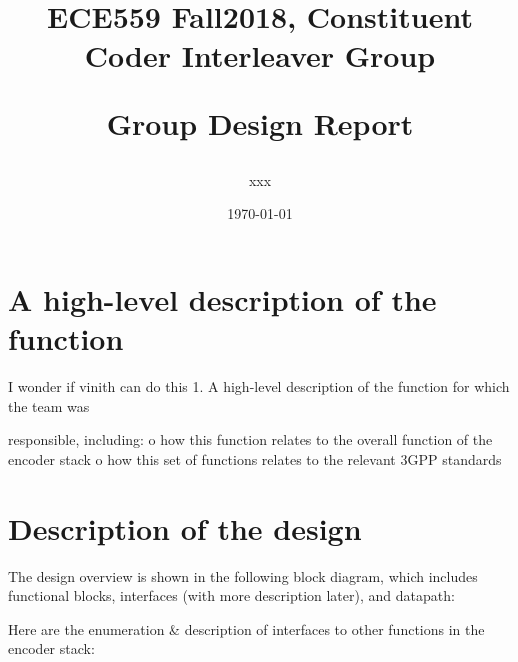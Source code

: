 \documentclass[letterpaper]{article} %
\begin{document}
\title{ECE559 Fall2018, Constituent Coder Interleaver Group\\
\begin{large}Group Design Report\end{large}}
\author{xxx}
\date{\today}%
\maketitle
\vspace{12.0cm}


\newpage 
\section{A high-level description of the function}
I wonder if vinith can do this
1.  A high-level description of the function for which the team was
    
        responsible, including:
         o  how this function relates to the overall function of the
            encoder stack
         o  how this set of functions relates to the relevant 3GPP standards
\section{Description of the design}

The design overview is shown in the following block diagram, which includes functional blocks, interfaces (with more description later), and datapath:\\

\begin{minipage}{1.0\textwidth}
\centering
{}
\centering
\end{minipage}
\bigskip

Here are the enumeration \& description of interfaces to other functions in the encoder stack:\\
\end{document}
